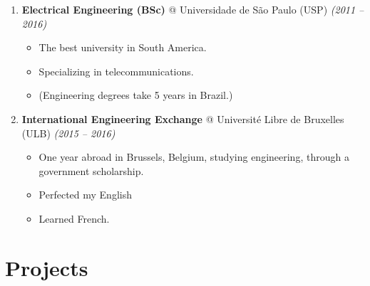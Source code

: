 \documentclass[14pt]{extarticle}
\renewcommand{\_}{\leavevmode\kern.06em\vbox{\hrule width.425em}}
\begin{document}
\begin{enumerate}
  \item \textbf{Electrical Engineering (BSc)} @ Universidade de São Paulo (USP) \textit{(2011 -- 2016)}
    \begin{itemize}
      \item The best university in South America.
      \item Specializing in telecommunications.
      \item (Engineering degrees take 5 years in Brazil.)
    \end{itemize}

  \item \textbf{International Engineering Exchange} @ Université Libre de Bruxelles (ULB) \textit{(2015 -- 2016)}
    \begin{itemize}
      \item One year abroad in Brussels, Belgium, studying engineering, \linebreak through a government scholarship.
      \item Perfected my English
      \item Learned French.
    \end{itemize}
\end{enumerate}

\section{Projects}
\end{document}
